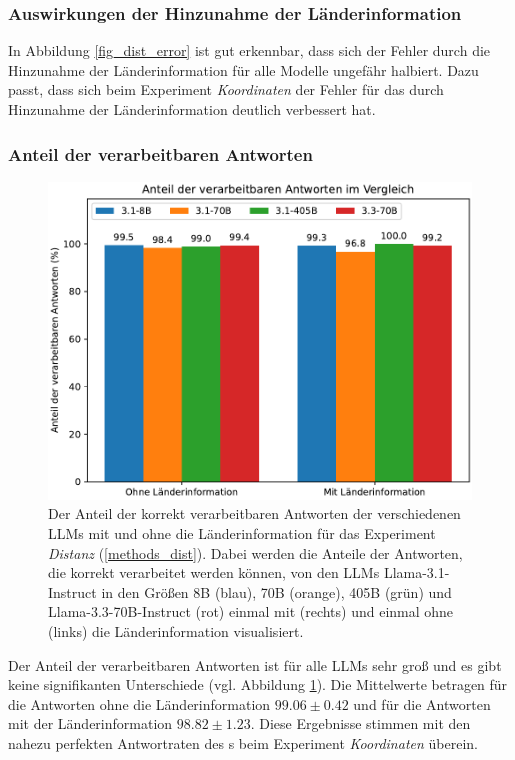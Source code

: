 \subsubsection*{Auswirkungen der Hinzunahme der Länderinformation}
In Abbildung \ref{fig_dist_error} ist gut erkennbar, dass sich der Fehler durch die Hinzunahme der Länderinformation für alle Modelle ungefähr halbiert.
Dazu passt, dass sich beim Experiment \textit{Koordinaten} der Fehler für das \jsonv{} durch Hinzunahme der Länderinformation deutlich verbessert hat.

\subsubsection*{Anteil der verarbeitbaren Antworten}

\begin{figure}[tb] %
    \centering
    \includegraphics[width=0.7\columnwidth]{img/distance_p.pdf}
    
    \caption{
        Der Anteil der korrekt verarbeitbaren Antworten der verschiedenen LLMs mit und ohne die Länderinformation für das Experiment \textit{Distanz} (\ref{methods_dist}).
        Dabei werden die Anteile der Antworten, die korrekt verarbeitet werden können, von den LLMs Llama-3.1-Instruct in den Größen 8B (blau), 70B (orange), 405B (grün) und Llama-3.3-70B-Instruct (rot) einmal mit (rechts) und einmal ohne (links) die Länderinformation visualisiert.
    }

    \label{fig_dist_p}
\end{figure}


Der Anteil der verarbeitbaren Antworten ist für alle LLMs sehr groß und es gibt keine signifikanten Unterschiede (vgl. Abbildung \ref{fig_dist_p}).
Die Mittelwerte betragen für die Antworten ohne die Länderinformation \( \num{99.06} \pm \num{0.42} \) und für die Antworten mit der Länderinformation \( \num{98.82} \pm \num{1.23} \).
Diese Ergebnisse stimmen mit den nahezu perfekten Antwortraten des \jsonv{}s beim Experiment \textit{Koordinaten} überein.

